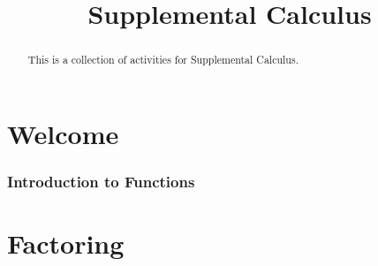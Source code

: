 \documentclass[handout]{xourse}
\title{Supplemental Calculus}
\begin{document}
\begin{abstract}
This is a collection of activities for Supplemental Calculus.
\end{abstract}

\maketitle

\part{Welcome}


%
%
%
\section{Introduction to Functions}

%
%

\part{Factoring}

\end{document}
